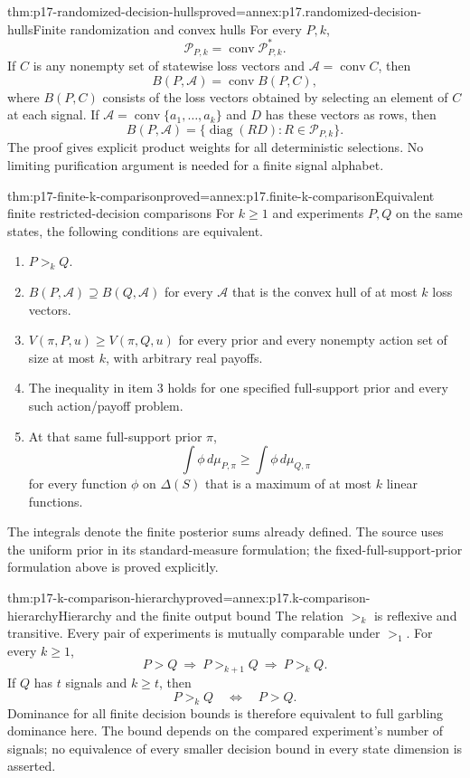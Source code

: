 \begin{hblemma}{thm:p17-randomized-decision-hulls}{proved=annex:p17.randomized-decision-hulls}{Finite randomization and convex hulls}
For every \(P,k\),
\[
           \mathcal P_{P,k}=\operatorname{conv}\mathcal P^*_{P,k}.
\]
If \(C\) is any nonempty set of statewise loss vectors and
\(\mathcal A=\operatorname{conv}C\), then
\[
                    B(P,\mathcal A)=\operatorname{conv}B(P,C),
\]
where \(B(P,C)\) consists of the loss vectors obtained by selecting an
element of \(C\) at each signal. If
\(\mathcal A=\operatorname{conv}\{a_1,\ldots,a_k\}\) and \(D\) has
these vectors as rows, then
\[
           B(P,\mathcal A)
                  =\{\operatorname{diag}(RD):R\in\mathcal P_{P,k}\}.
\]
The proof gives explicit product weights for all deterministic selections.
No limiting purification argument is needed for a finite signal alphabet.
\end{hblemma}

\begin{hbtheorem}{thm:p17-finite-k-comparison}{proved=annex:p17.finite-k-comparison}{Equivalent finite restricted-decision comparisons}
For \(k\geq1\) and experiments \(P,Q\) on the same states, the following
conditions are equivalent.
\begin{enumerate}
\item \(P>_kQ\).
\item \(B(P,\mathcal A)\supseteq B(Q,\mathcal A)\) for every
      \(\mathcal A\) that is the convex hull of at most \(k\) loss vectors.
\item \(V(\pi,P,u)\geq V(\pi,Q,u)\) for every prior and every nonempty
      action set of size at most \(k\), with arbitrary real payoffs.
\item The inequality in item 3 holds for one specified full-support
      prior and every such action/payoff problem.
\item At that same full-support prior \(\pi\),
      \[
       \int\phi\,d\mu_{P,\pi}\geq\int\phi\,d\mu_{Q,\pi}
      \]
      for every function \(\phi\) on \(\Delta(S)\) that is a maximum of
      at most \(k\) linear functions.
\end{enumerate}
The integrals denote the finite posterior sums already defined.
The source uses the uniform prior in its standard-measure formulation;
the fixed-full-support-prior formulation above is proved explicitly.
\end{hbtheorem}

\begin{hbcorollary}{thm:p17-k-comparison-hierarchy}{proved=annex:p17.k-comparison-hierarchy}{Hierarchy and the finite output bound}
The relation \(>_k\) is reflexive and transitive. Every pair of experiments
is mutually comparable under \(>_1\). For every \(k\geq1\),
\[
              P>Q\ \Longrightarrow\ P>_{k+1}Q\
                         \Longrightarrow\ P>_kQ.
\]
If \(Q\) has \(t\) signals and \(k\geq t\), then
\[
                         P>_kQ\quad\Longleftrightarrow\quad P>Q.
\]
Dominance for all finite decision bounds is therefore equivalent to full
garbling dominance here. The bound depends on the compared experiment's
number of signals; no equivalence of every smaller decision bound in
every state dimension is asserted.
\end{hbcorollary}

